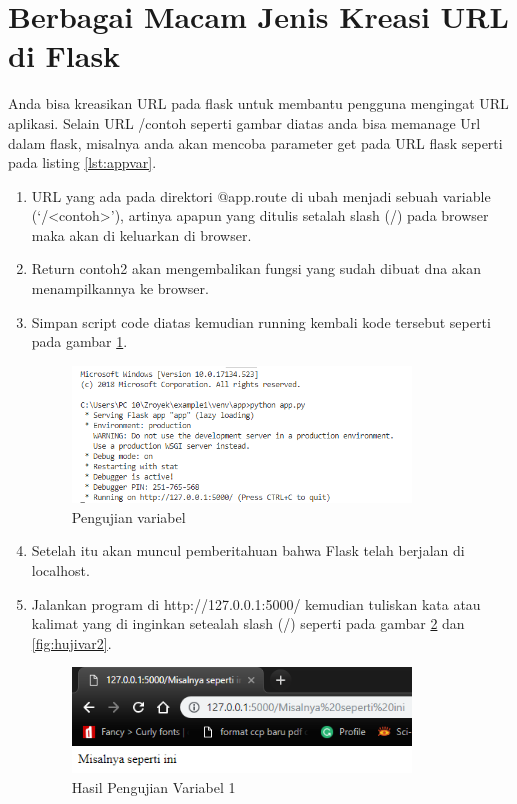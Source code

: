 \section{Berbagai Macam Jenis Kreasi URL di Flask}
Anda bisa kreasikan URL pada flask untuk membantu pengguna mengingat URL aplikasi. Selain URL /contoh seperti gambar diatas anda bisa memanage Url dalam flask, misalnya anda akan mencoba parameter get pada URL flask seperti pada listing \ref{lst:appvar}.

\begin{enumerate}
\item URL yang ada  pada direktori @app.route di ubah menjadi sebuah variable (‘/<contoh>’), artinya apapun yang ditulis setalah slash (/) pada browser maka akan di keluarkan di browser. 
\item Return contoh2 akan mengembalikan fungsi yang sudah dibuat dna akan menampilkannya ke browser.
\item Simpan script code diatas kemudian running kembali kode tersebut seperti pada gambar \ref{fig:ujivar}.
\begin{figure}[!htbp]
	\centerline{\includegraphics[width=0.85\textwidth]{figures/9/ujivar.PNG}}
	\caption{Pengujian variabel}
	\label{fig:ujivar}
\end{figure}

\item Setelah itu akan muncul pemberitahuan bahwa Flask telah berjalan di localhost.
\item Jalankan program di http://127.0.0.1:5000/ kemudian tuliskan kata atau kalimat yang di inginkan setealah slash (/) seperti pada gambar \ref{fig:hujivar1} dan \ref{fig:hujivar2}.
\begin{figure}[!htbp]
	\centerline{\includegraphics[width=0.85\textwidth]{figures/9/hujivar1.PNG}}
	\caption{Hasil Pengujian Variabel 1}
	\label{fig:hujivar1}
\end{figure}


\end{enumerate}
